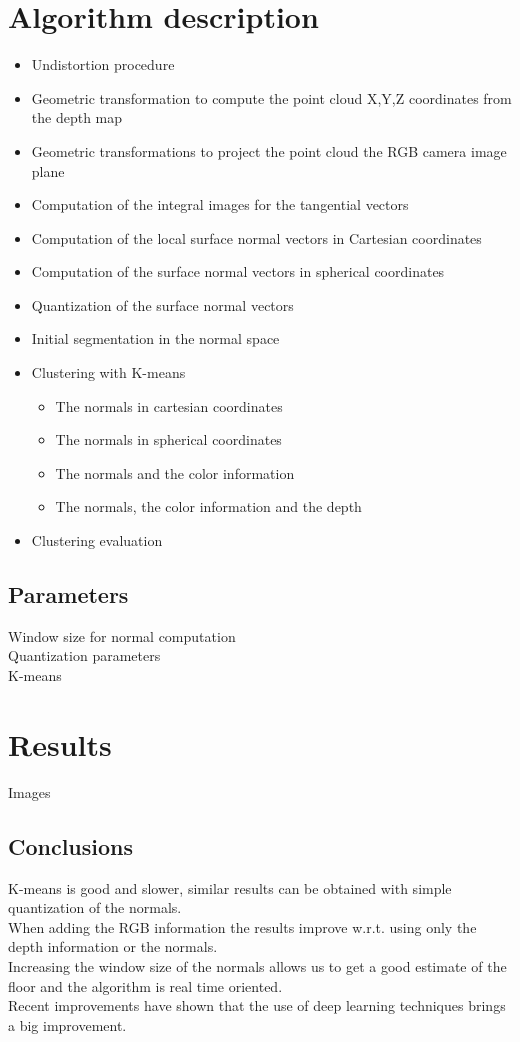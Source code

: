 \documentclass[11pt]{article}
\begin{document}
\section{Algorithm description}
\begin{itemize}
\item Undistortion procedure
\item Geometric transformation to compute the point cloud X,Y,Z coordinates from the depth map
\item Geometric transformations to project the point cloud the RGB camera image plane
\item Computation of the integral images for the tangential vectors
\item Computation of the local surface normal vectors in Cartesian coordinates
\item Computation of the surface normal vectors in spherical coordinates
\item Quantization of the surface normal vectors
\item Initial segmentation in the normal space
\item Clustering with K-means\begin{itemize}
\item The normals in cartesian coordinates
\item The normals in spherical coordinates
\item The normals and the color information
\item The normals, the color information and the depth
\end{itemize}
\item Clustering evaluation
\end{itemize}
\subsection{Parameters}
Window size for normal computation\\
Quantization parameters\\
K-means
\section{Results}
Images
\subsection{Conclusions}
K-means is good and slower, similar results can be obtained with simple quantization of the normals.\\
When adding the RGB information the results improve w.r.t. using only the depth information or the normals.\\
Increasing the window size of the normals allows us to get a good estimate of the floor and the algorithm is real time oriented.\\
Recent improvements have shown that the use of deep learning techniques brings a big improvement.
\end{document}
